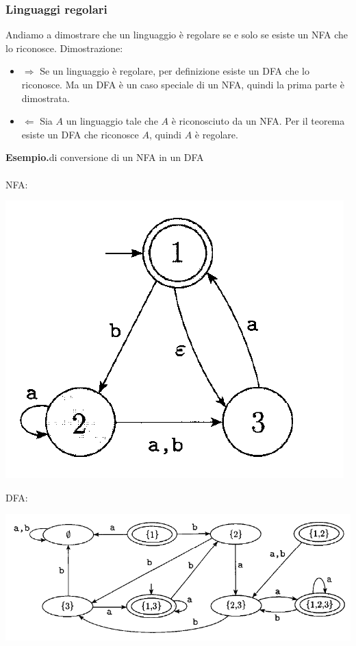 \documentclass[italian]{article}
\newcommand{\example}{\noindent\textbf{Esempio.\quad}}
\begin{document}
\subsubsection{Linguaggi regolari}
Andiamo a dimostrare che un linguaggio è regolare se e solo se esiste un NFA che lo riconosce. Dimostrazione:
\begin{itemize}[label={}]
	\item $\Rightarrow$ Se un linguaggio è regolare, per definizione esiste un DFA che lo riconosce. Ma un DFA è un caso speciale di un NFA, quindi la prima parte è dimostrata.
	\item $\Leftarrow$ Sia $A$ un linguaggio tale che $A$ è riconosciuto da un NFA. Per il teorema esiste un DFA che riconosce $A$, quindi $A$ è regolare.
\end{itemize}
\example di conversione di un NFA in un DFA \\\\
NFA:
\begin{center}
	\includegraphics[width=0.3\linewidth]{images/nfa_3}
\end{center}
DFA:
\begin{center}
	\includegraphics[width=0.7\linewidth]{images/nfa_4}
\end{center}
\end{document}
